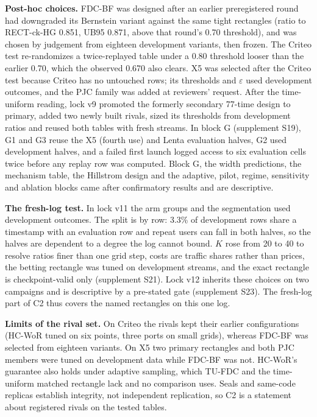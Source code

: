 \documentclass[sigconf,anonymous,review]{acmart}
\newcommand{\eps}{\varepsilon}
\begin{document}
\textbf{Post-hoc choices.} FDC-BF was designed after an earlier preregistered round had downgraded its Bernstein variant against the same tight rectangles (ratio to RECT-ck-HG 0.851, UB95 0.871, above that round's 0.70 threshold), and was chosen by judgement from eighteen development variants, then frozen. The Criteo test re-randomizes a twice-replayed table under a 0.80 threshold looser than the earlier 0.70, which the observed 0.670 also clears. X5 was selected after the Criteo test because Criteo has no untouched rows; its thresholds and $\eps$ used development outcomes, and the PJC family was added at reviewers' request. After the time-uniform reading, lock v9 promoted the formerly secondary 77-time design to primary, added two newly built rivals, sized its thresholds from development ratios and reused both tables with fresh streams. In block G (supplement S19), G1 and G3 reuse the X5 (fourth use) and Lenta evaluation halves, G2 used development halves, and a failed first launch logged access to six evaluation cells twice before any replay row was computed. Block G, the width predictions, the mechanism table, the Hillstrom design and the adaptive, pilot, regime, sensitivity and ablation blocks came after confirmatory results and are descriptive.

\textbf{The fresh-log test.} In lock v11 the arm groups and the segmentation used development outcomes. The split is by row: 3.3\% of development rows share a timestamp with an evaluation row and repeat users can fall in both halves, so the halves are dependent to a degree the log cannot bound. $K$ rose from 20 to 40 to resolve ratios finer than one grid step, costs are traffic shares rather than prices, the betting rectangle was tuned on development streams, and the exact rectangle is checkpoint-valid only (supplement S21). Lock v12 inherits these choices on two campaigns and is descriptive by a pre-stated gate (supplement S23). The fresh-log part of C2 thus covers the named rectangles on this one log.

\textbf{Limits of the rival set.} On Criteo the rivals kept their earlier configurations (HC-WoR tuned on six points, three ports on small grids), whereas FDC-BF was selected from eighteen variants. On X5 two primary rectangles and both PJC members were tuned on development data while FDC-BF was not. HC-WoR's guarantee also holds under adaptive sampling, which TU-FDC and the time-uniform matched rectangle lack and no comparison uses. Seals and same-code replicas establish integrity, not independent replication, so C2 is a statement about registered rivals on the tested tables.
\end{document}
